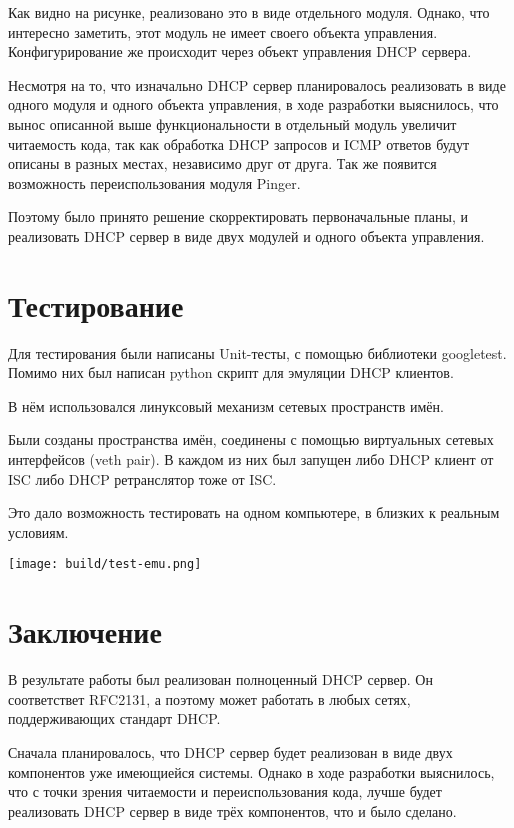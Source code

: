 \documentclass[14pt,a4paper]{extarticle}
\begin{document}
Как видно на рисунке, реализовано это в виде отдельного модуля. Однако, что интересно заметить, этот модуль не имеет своего объекта управления. Конфигурирование же происходит через объект управления DHCP сервера.

Несмотря на то, что изначально DHCP сервер планировалось реализовать в виде одного модуля и одного объекта управления, в ходе разработки выяснилось, что вынос описанной выше функциональности в отдельный модуль увеличит читаемость кода, так как обработка DHCP запросов и ICMP ответов будут описаны в разных местах, независимо друг от друга. Так же появится возможность переиспользования модуля Pinger.

Поэтому было принято решение скорректировать первоначальные планы, и реализовать DHCP сервер в виде двух модулей и одного объекта управления.

\pagebreak
\section{Тестирование}

Для тестирования были написаны Unit-тесты, с помощью библиотеки googletest.
Помимо них был написан python скрипт для эмуляции DHCP клиентов.

В нём использовался линуксовый механизм сетевых пространств имён.

Были созданы пространства имён, соединены с помощью виртуальных сетевых интерфейсов (veth pair). В каждом из них был запущен либо DHCP клиент от ISC либо DHCP ретранслятор тоже от ISC.

Это дало возможность тестировать на одном компьютере, в близких к реальным условиям.

\texttt{[image: build/test-emu.png]}

\pagebreak
\section*{Заключение}

В результате работы был реализован полноценный DHCP сервер.
Он соответствет RFC2131, а поэтому может работать в любых сетях, поддерживающих стандарт DHCP.

Сначала планировалось, что DHCP сервер будет реализован в виде двух компонентов уже имеющиейся системы. Однако в ходе разработки выяснилось, что с точки зрения читаемости и переиспользования кода, лучше будет реализовать DHCP сервер в виде трёх компонентов, что и было сделано.
\end{document}

